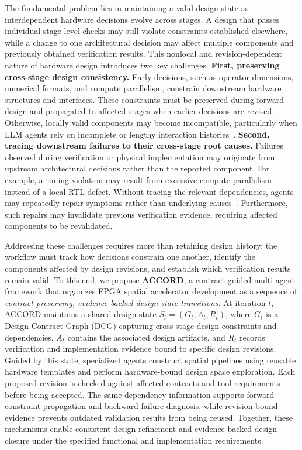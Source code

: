 The fundamental problem lies in maintaining a valid design state as interdependent hardware decisions evolve across stages. A design that passes individual stage-level checks may still violate constraints established elsewhere, while a change to one architectural decision may affect multiple components and previously obtained verification results. This nonlocal and revision-dependent nature of hardware design introduces two key challenges. \textbf{First, preserving cross-stage design consistency.} Early decisions, such as operator dimensions, numerical formats, and compute parallelism, constrain downstream hardware structures and interfaces. These constraints must be preserved during forward design and propagated to affected stages when earlier decisions are revised. Otherwise, locally valid components may become incompatible, particularly when LLM agents rely on incomplete or lengthy interaction histories~\cite{lostmiddle,longbench,locomo}. \textbf{Second, tracing downstream failures to their cross-stage root causes.} Failures observed during verification or physical implementation may originate from upstream architectural decisions rather than the reported component. For example, a timing violation may result from excessive compute parallelism instead of a local RTL defect. Without tracing the relevant dependencies, agents may repeatedly repair symptoms rather than underlying causes~\cite{swesearch}. Furthermore, such repairs may invalidate previous verification evidence, requiring affected components to be revalidated.

Addressing these challenges requires more than retaining design history: the workflow must track how decisions constrain one another, identify the components affected by design revisions, and establish which verification results remain valid. To this end, we propose \textbf{ACCORD}, a contract-guided multi-agent framework that organizes FPGA spatial accelerator development as a sequence of \emph{contract-preserving, evidence-backed design state transitions}. At iteration $t$, ACCORD maintains a shared design state $S_t=(G_t,A_t,R_t)$, where $G_t$ is a Design Contract Graph (DCG) capturing cross-stage design constraints and dependencies, $A_t$ contains the associated design artifacts, and $R_t$ records verification and implementation evidence bound to specific design revisions. Guided by this state, specialized agents construct spatial pipelines using reusable hardware templates and perform hardware-bound design space exploration. Each proposed revision is checked against affected contracts and tool requirements before being accepted. The same dependency information supports forward constraint propagation and backward failure diagnosis, while revision-bound evidence prevents outdated validation results from being reused. Together, these mechanisms enable consistent design refinement and evidence-backed design closure under the specified functional and implementation requirements.

